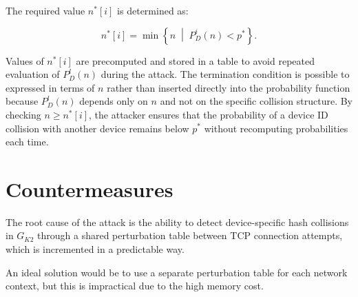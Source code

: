 \documentclass[twocolumn]{report}
\begin{document}
The required value \( n^*[i] \) is determined as:

\begin{minipage}{\columnwidth}
  \[
n^*[i]
=
\min
\left\{
n
\;\middle|\;
P_D^i(n)
<
p^*
\right\}.
\]
\end{minipage}

Values of \( n^*[i] \) are \alert{precomputed} and stored in a table to avoid repeated evaluation of \( P^l_D(n) \) during the attack. The termination condition is possible to expressed in terms of \( n \) rather than inserted directly into the probability function because \( P^l_D(n) \) depends only on \( n \) and \alert{not on the specific collision structure}. By checking \( n \ge n^*[i] \), the attacker ensures that the probability of a device ID collision with another device remains below \( p^* \) \alert{without recomputing probabilities} each time.

\vspace{0.2cm}


\section{Countermeasures}
\label{sec:countermeasures}

The \alert{root cause} of the attack is the ability to detect device-specific hash collisions in $G_{K2}$ through a shared perturbation table between TCP connection attempts, which is incremented in a predictable way.

An \alert{ideal solution} would be to use a separate perturbation table for each network context, but this is impractical due to the high memory cost.%
\end{document}
